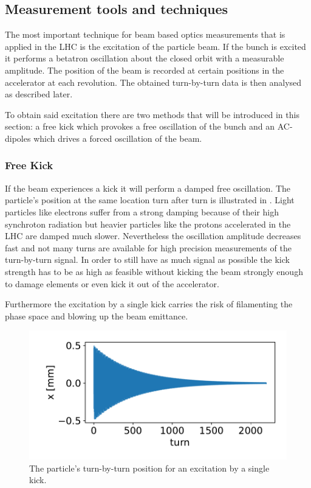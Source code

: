 \subsection{Measurement tools and techniques}

The most important technique for beam based optics measurements that is applied in the LHC is the excitation
of the particle beam.
If the bunch is excited it performs a betatron oscillation about the closed orbit with a measurable amplitude.
The position of the beam is recorded at certain positions in the accelerator at each revolution. The
obtained turn-by-turn data is then analysed as described later.

To obtain said excitation there are two methods that will be introduced in this section: a free kick
which provokes a free oscillation of the bunch and an AC-dipoles which drives a forced oscillation of
the beam. 

\subsubsection{Free Kick}

If the beam experiences a kick it will perform a damped free oscillation.
The particle's position at the same location turn after turn is illustrated in .
Light particles like electrons
suffer from a strong damping because of their high synchroton radiation but heavier particles like the
protons accelerated in the LHC are damped much slower.
Nevertheless the oscillation amplitude decreases fast and not many turns are available for high
precision measurements of the turn-by-turn signal. In order to still have as much signal as possible
the kick strength has to be as high as feasible without kicking the beam strongly enough to damage elements or even kick it out of the accelerator.

Furthermore the excitation by a single kick carries the risk of filamenting the
phase space and blowing up the beam emittance.
%
\begin{figure}[ht]
    \centering
    \includegraphics[width=.8\linewidth]{kick_plot.pdf}  
    \caption{The particle's turn-by-turn position for an excitation by a single kick.}
    \label{fig_kick_plot}
\end{figure}
%

